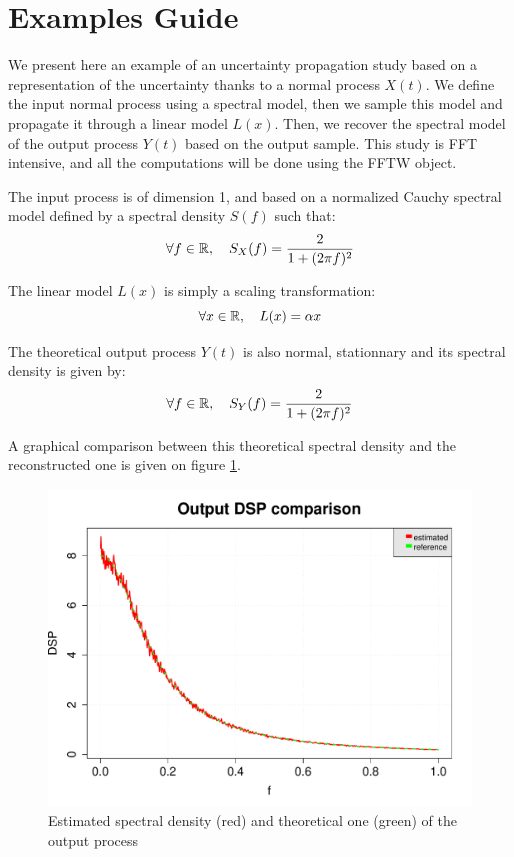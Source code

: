 % 




\section{Examples Guide}

We present here an example of an uncertainty propagation study based on a representation of the uncertainty thanks to a normal process $X(t)$. We define the input normal process using a spectral model, then we sample this model and propagate it through a linear model $L(x)$. Then, we recover the spectral model of the output process $Y(t)$ based on the output sample. This study is FFT intensive, and all the computations will be done using the FFTW object.

The input process is of dimension 1, and based on a normalized Cauchy spectral model defined by a spectral density $S(f)$ such that:
$$
  \forall f\in{\mathbb R},\quad S_X(f)=\frac{2}{1+(2\pi f)^2}
$$

The linear model $L(x)$ is simply a scaling transformation:
$$
  \forall x\in{\mathbb R},\quad L(x)=\alpha x
$$

The theoretical output process $Y(t)$ is also normal, stationnary and its spectral density is given by:
$$
  \forall f\in{\mathbb R},\quad S_Y(f)=\frac{2}{1+(2\pi f)^2}
$$

A graphical comparison between this theoretical spectral density and the reconstructed one is given on figure \ref{DSPComparison}.

\begin{figure}[h]
  \centering
  \includegraphics[width=\textwidth]{DSPComparison.pdf}
  \caption{Estimated spectral density (red) and theoretical one (green) of the output process}
  \label{DSPComparison}
\end{figure}

